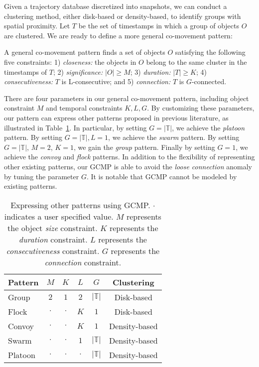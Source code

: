 Given a trajectory database discretized into snapshots, we can conduct a clustering method, either disk-based or density-based, to identify groups with spatial proximity. Let $T$ be the set of timestamps in which a group of objects $O$ are clustered. We are ready to define a more general co-movement pattern:
\begin{definition}
A general co-movement pattern finds a set of objects $O$ satisfying the following five constraints: 1) \textit{closeness:} the objects in $O$ belong to the same cluster in the timestamps of $T$; 2) \textit{significance:} $|O| \geq M$; 3) \textit{duration:} $|T| \geq K$; 4) \textit{consecutiveness:} $T$ is L-consecutive; and 5) \textit{connection:} $T$ is $G$-connected.
\end{definition}
There are four parameters in our general co-movement pattern, including object constraint $M$ and temporal constraints $K,L,G$.  By customizing these parameters, our pattern can 
express other patterns proposed in previous literature, as illustrated in Table~\ref{tbl:patterns}. 
In particular, by setting $G=|\mathbb{T}|$, we achieve the \emph{platoon} pattern. By setting $G=|\mathbb{T}|,L=1$, we achieve the \emph{swarm} pattern. By setting $G=|\mathbb{T}|$, $M=2$, $K=1$, we gain the \emph{group} pattern. Finally by setting $G=1$, we achieve the \emph{convoy} and \emph{flock} patterns. 
In addition to the flexibility of representing other existing patterns, our GCMP is able to avoid the \emph{loose connection} anomaly by tuning the parameter $G$. 
It is notable that GCMP cannot be modeled by existing patterns. 
\begin{table}
\centering
\begin{tabular}{|l|c|c|c|c|c|}
\hline 
Pattern & $M$ & $K$ & $L$ & $G$ & Clustering\\ 
\hline
Group & $2$ & $1$ & $2$ & $|\mathbb{T}|$ & Disk-based\\
\hline
Flock & $\cdot$ & $\cdot$ & $K$ & $1$ & Disk-based \\
\hline 
Convoy & $\cdot$ & $\cdot$ & $K$ & $1$ & Density-based\\ 
\hline 
Swarm & $\cdot$ & $\cdot$ & $1$ & $|\mathbb{T}|$ & Density-based \\ 
\hline 
Platoon & $\cdot$ & $\cdot$ & $\cdot$ & $|\mathbb{T}|$ & Density-based\\ 
\hline 
\end{tabular} 
\caption{Expressing other patterns using GCMP. $\cdot$ indicates a user specified value. $M$ represents the 
object \emph{size} constraint. $K$ represents the \emph{duration} constraint. $L$ represents the \emph{consecutiveness} constraint. $G$ represents the \emph{connection} constraint.}
\label{tbl:patterns}
\end{table}
 
